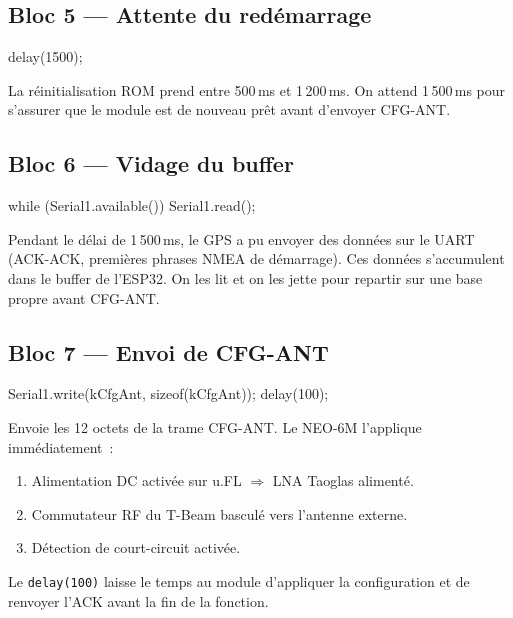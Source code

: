 \documentclass[12pt,a4paper]{article}
\newcommand{\code}[1]{\texttt{#1}}
\begin{document}
\subsection{Bloc 5 --- Attente du red\'emarrage}

\begin{cppbox}
delay(1500);
\end{cppbox}

La r\'einitialisation ROM prend entre 500\,ms et 1\,200\,ms. On attend
1\,500\,ms pour s'assurer que le module est de nouveau pr\^et avant d'envoyer
CFG-ANT.

\subsection{Bloc 6 --- Vidage du buffer}

\begin{cppbox}
while (Serial1.available()) Serial1.read();
\end{cppbox}

Pendant le d\'elai de 1\,500\,ms, le GPS a pu envoyer des donn\'ees sur le
UART (ACK-ACK, premi\`eres phrases NMEA de d\'emarrage). Ces donn\'ees
s'accumulent dans le buffer de l'ESP32. On les lit et on les jette pour
repartir sur une base propre avant CFG-ANT.

\subsection{Bloc 7 --- Envoi de CFG-ANT}

\begin{cppbox}
Serial1.write(kCfgAnt, sizeof(kCfgAnt));
delay(100);
\end{cppbox}

Envoie les 12 octets de la trame CFG-ANT. Le NEO-6M l'applique
imm\'ediatement~:

\begin{enumerate}
  \item Alimentation DC activ\'ee sur u.FL $\Rightarrow$ LNA Taoglas aliment\'e.
  \item Commutateur RF du T-Beam bascul\'e vers l'antenne externe.
  \item D\'etection de court-circuit activ\'ee.
\end{enumerate}

Le \code{delay(100)} laisse le temps au module d'appliquer la configuration
et de renvoyer l'ACK avant la fin de la fonction.

\end{document}
